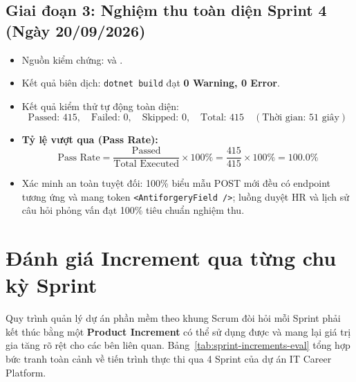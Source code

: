 \subsection{Giai đoạn 3: Nghiệm thu toàn diện Sprint 4 (Ngày 20/09/2026)}
\begin{itemize}
    \item Nguồn kiểm chứng:  và .
    \item Kết quả biên dịch: \texttt{dotnet build} đạt \textbf{0 Warning, 0 Error}.
    \item Kết quả kiểm thử tự động toàn diện:
    \begin{equation}
    \text{Passed: } 415, \quad \text{Failed: } 0, \quad \text{Skipped: } 0, \quad \text{Total: } 415 \quad (\text{Thời gian: } 51 \text{ giây})
    \end{equation}
    \item \textbf{Tỷ lệ vượt qua (Pass Rate):}
    \begin{equation}
    \text{Pass Rate} = \frac{\text{Passed}}{\text{Total Executed}} \times 100\% = \frac{415}{415} \times 100\% = \mathbf{100.0\%}
    \end{equation}
    \item Xác minh an toàn tuyệt đối: 100\% biểu mẫu POST mới đều có endpoint tương ứng và mang token \texttt{<AntiforgeryField />}; luồng duyệt HR và lịch sử câu hỏi phỏng vấn đạt 100\% tiêu chuẩn nghiệm thu.
\end{itemize}

\section{Đánh giá Increment qua từng chu kỳ Sprint}
\label{sec:danh-gia-increment}

Quy trình quản lý dự án phần mềm theo khung Scrum đòi hỏi mỗi Sprint phải kết thúc bằng một \textbf{Product Increment} có thể sử dụng được và mang lại giá trị gia tăng rõ rệt cho các bên liên quan. Bảng~\ref{tab:sprint-increments-eval} tổng hợp bức tranh toàn cảnh về tiến trình thực thi qua 4 Sprint của dự án IT Career Platform.

